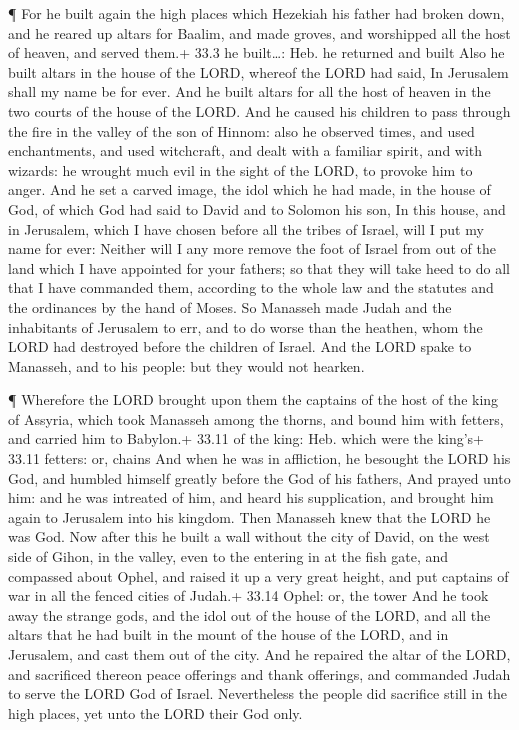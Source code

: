  ¶ For he built again the high places which Hezekiah his
father had broken down, and he reared up altars for Baalim, and made
groves, and worshipped all the host of heaven, and served them.+ 33.3 he
built\ldots: Heb. he returned and built  Also he built
altars in the house of the LORD, whereof the LORD had said, In Jerusalem
shall my name be for ever.  And he built altars for all the
host of heaven in the two courts of the house of the LORD. 
And he caused his children to pass through the fire in the valley of the
son of Hinnom: also he observed times, and used enchantments, and used
witchcraft, and dealt with a familiar spirit, and with wizards: he
wrought much evil in the sight of the LORD, to provoke him to anger.
 And he set a carved image, the idol which he had made, in
the house of God, of which God had said to David and to Solomon his son,
In this house, and in Jerusalem, which I have chosen before all the
tribes of Israel, will I put my name for ever:  Neither will
I any more remove the foot of Israel from out of the land which I have
appointed for your fathers; so that they will take heed to do all that I
have commanded them, according to the whole law and the statutes and the
ordinances by the hand of Moses.  So Manasseh made Judah and
the inhabitants of Jerusalem to err, and to do worse than the heathen,
whom the LORD had destroyed before the children of Israel. 
And the LORD spake to Manasseh, and to his people: but they would not
hearken.

 ¶ Wherefore the LORD brought upon them the captains of the
host of the king of Assyria, which took Manasseh among the thorns, and
bound him with fetters, and carried him to Babylon.+ 33.11 of the king:
Heb. which were the king's+ 33.11 fetters: or, chains  And
when he was in affliction, he besought the LORD his God, and humbled
himself greatly before the God of his fathers,  And prayed
unto him: and he was intreated of him, and heard his supplication, and
brought him again to Jerusalem into his kingdom. Then Manasseh knew that
the LORD he was God.  Now after this he built a wall
without the city of David, on the west side of Gihon, in the valley,
even to the entering in at the fish gate, and compassed about Ophel, and
raised it up a very great height, and put captains of war in all the
fenced cities of Judah.+ 33.14 Ophel: or, the tower  And he
took away the strange gods, and the idol out of the house of the LORD,
and all the altars that he had built in the mount of the house of the
LORD, and in Jerusalem, and cast them out of the city.  And
he repaired the altar of the LORD, and sacrificed thereon peace
offerings and thank offerings, and commanded Judah to serve the LORD God
of Israel.  Nevertheless the people did sacrifice still in
the high places, yet unto the LORD their God only.

